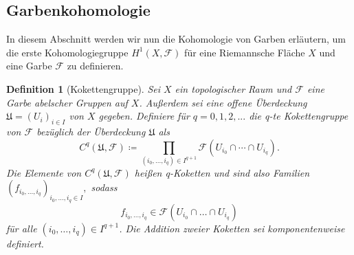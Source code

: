\documentclass[11pt,a4paper,toc=bibliography]{scrartcl}
\theoremstyle{def}
\newtheorem{defi}{Definition}[section]
\theoremstyle{thm}
\theoremstyle{remark}
\begin{document}
\subsection{Garbenkohomologie}
In diesem Abschnitt werden wir nun die Kohomologie von Garben erläutern, um die erste Kohomologiegruppe $H^1(X,\mathcal{F})$ für eine Riemannsche Fläche $X$ und eine Garbe $\mathcal{F}$ zu definieren.

\begin{defi}[Kokettengruppe]
Sei $X$ ein topologischer Raum und $\mathcal{F}$ eine Garbe abelscher Gruppen auf $X$. Außerdem sei eine offene Überdeckung $\mathfrak{U}= (U_i)_{i\in I}$ von $X$ gegeben.
Definiere für $q =0,1,2,...$ die \emph{q-te Kokettengruppe} von $\mathcal{F}$ bezüglich der Überdeckung $\mathfrak{U}$ als 
\[
C^q(\mathfrak{U},\mathcal{F}) \coloneqq \prod_{(i_0,...,i_q)\in I^{q+1}} \mathcal{F}(U_{i_0}\cap \cdots\cap U_{i_q}). 
\]
Die Elemente von $C^q(\mathfrak{U},\mathcal{F})$ heißen \emph{q-Koketten} und sind also Familien
$
(f_{i_0,...,i_q})_{i_0,...,i_q\in I}, 
$
sodass
\[
 f_{i_0,...,i_q}\in\mathcal{F}(U_{i_0}\cap \ldots \cap U_{i_q})
\]
für alle $(i_0,\ldots,i_q)\in I^{q+1}$.
Die Addition zweier Koketten sei komponentenweise definiert.
\end{defi}
\end{document}
